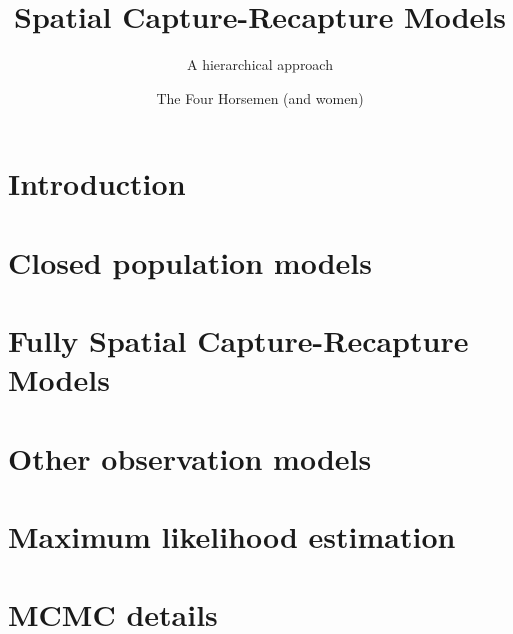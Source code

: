 \documentclass{book}
\begin{document}
\title{ Spatial Capture-Recapture Models }
\subtitle{ A hierarchical approach }
\author{The Four Horsemen (and women) }

\address{
USGS Patuxent Wildlife Research Center \\
North Carolina State University
}

\maketitle

\newpage

\setcounter{tocdepth}{2}
\tableofcontents

\chapter{Introduction}
\label{chapt.intro}



\chapter{Closed population models}
\label{chapt.closed}



\chapter{Fully Spatial Capture-Recapture Models}
\label{chapt.scr0}



\chapter{Other observation models}
\label{chapt.poisson}

%

\chapter{Maximum likelihood estimation}
\label{chapt.mle}



\chapter{MCMC details}
\label{chapt.mcmc}
\end{document}
